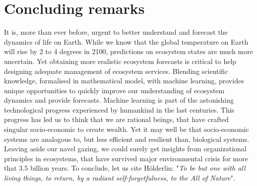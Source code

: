 % 



\section{Concluding remarks}

It is, more than ever before, urgent to better understand and forecast the dynamics of life on Earth.
% 
While we know that the global temperature on Earth will rise by 2 to 4 degrees in 2100, predictions on ecosystem states are much more uncertain. Yet obtaining more realistic ecosystem forecasts is critical to help designing adequate management of ecosystem services.
% 
Blending scientific knowledge, formalised in mathematical model, with machine learning, provides unique opportunities to quickly improve our understanding of ecosystem dynamics and provide forecasts. %
% 
Machine learning is part of the astonishing technological progress experienced by humankind in the last centuries. This progress has led us to think that we are rational beings, that have crafted singular socio-economic to create wealth. Yet it may well be that socio-economic systems are analogous to, but less efficient and resilient than, biological systems. 
% 
Leaving aside our navel gazing, we could surely get insights from organizational principles in ecosystems, that have survived major environmental crisis for more that 3.5 billion years.
% 
To conclude, let us cite Hölderlin: "\textit{To be but one with all living things, to return, by a radiant self-forgetfulness, to the All of Nature}". 













